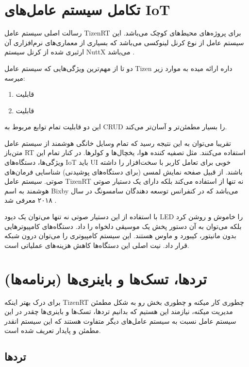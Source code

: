 \documentclass[10pt, a4paper]{article}
\begin{document}
\section{تکامل سیستم عامل‌های IoT}

رسالت اصلی سیستم عامل TizenRT برای پروژه‌های محیط‌های کوچک می‌باشد. این سیستم
عامل از نوع کرنل لینوکسی می‌باشد که بسیاری از معماری‌های نرم‌افزاری آن ارثبری
شده از کرنل سیستم NuttX می‌باشد \cite{nuttx}.

دو تا از مهم‌ترین ویژگی‌هایی که سیستم عامل Tizen داره ارائه میده به موارد زیر
میرسه:

\begin{enumerate}
    \item قابلیت 
    \item قابلیت 
\end{enumerate}

این دو قابلیت تمام توابع مربوط به CRUD را بسیار مطمئن‌تر و آسان‌تر می‌کند.

تقریبا می‌توان به این نتیجه رسید که تمام وسایل خانگی هوشمند از سیستم عامل
متن‌باز RT استفاده می‌کنند. مثل تصفیه کننده هوا، یخچال‌ها و کولر‌ها. در کنار
تمام این ویژگی‌ها، دستگاه‌های IoT باید UI خوبی برای تعامل کاربر با سخت‌افزار را
داشته باشند. از قبیل صفحه نمایش لمسی (برای دستگاه‌های پوشیدنی) شناسایی فرمان‌های
صوتی. سیستم عامل TizenRT نه تنها از  استفاده می‌کند
بلکه دارای یک دستیار صوتی هوشمند به اسم Bixby می‌باشد که در کنفرانس توسعه
دهندگان سامسونگ در سال ۲۰۱۸ معرفی شد \cite{samsungbixby}.

با استفاده از این دستیار صوتی نه تنها می‌توان یک دیود LED را خاموش و روشن کرد
بلکه می‌توان به آن دستور پخش یک موسیقی دلخواه را داد. دستگاه‌های  کامپیوتر‌هایی بدون مانیتور، کیبورد و ماوس‌ هستند.  این سیستم کامپیوتری
را می‌توان درون شبکه قرار داد. نیت اصلی این دستگاه‌ها کاهش هزینه‌های عملیاتی
است.

\section{ترد‌ها، تسک‌ها و باینری‌ها (برنامه‌ها)}

برای درک بهتر اینکه TizenRT چطوری کار میکنه و چطوری بخش  رو به
شکل مطمئن مدیریت میکنه، نیازمند این هستیم که بدانیم تردها، تسک‌ها و باینری‌ها
چقدر در این سیستم عامل نسبت به سیستم عامل‌های دیگر متفاوت هستند که این سیستم
انقدر مطمئن و پایدار تعریف شده است.

\subsection{تردها}
\end{document}
